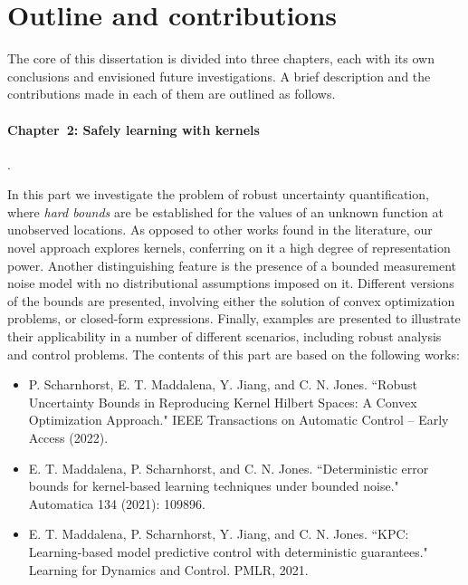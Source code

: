 


\section{Outline and contributions}

The core of this dissertation is divided into three chapters, each with its own conclusions and envisioned future investigations. A brief description and the contributions made in each of them are outlined as follows.

\paragraph{Chapter~2: Safely learning with kernels}. 

In this part we investigate the problem of robust uncertainty quantification, where \textit{hard bounds} are be established for the values of an unknown function at unobserved locations. As opposed to other works found in the literature, our novel approach explores kernels, conferring on it a high degree of representation power. Another distinguishing feature is the presence of a bounded measurement noise model with no distributional assumptions imposed on it. Different versions of the bounds are presented, involving either the solution of convex optimization problems, or closed-form expressions. Finally, examples are presented to illustrate their applicability in a number of different scenarios, including robust analysis and control problems. The contents of this part are based on the following works:
\begin{itemize}
	\item P. Scharnhorst, E. T. Maddalena, Y. Jiang, and C. N. Jones. ``Robust Uncertainty Bounds in Reproducing Kernel Hilbert Spaces: A Convex Optimization Approach." IEEE Transactions on Automatic Control -- Early Access (2022).
	
	\item E. T. Maddalena, P. Scharnhorst, and C. N. Jones. ``Deterministic error bounds for kernel-based learning techniques under bounded noise." Automatica 134 (2021): 109896.
		
	\item E. T. Maddalena, P. Scharnhorst, Y. Jiang, and C. N. Jones. ``KPC: Learning-based model predictive control with deterministic guarantees." Learning for Dynamics and Control. PMLR, 2021.
\end{itemize}

